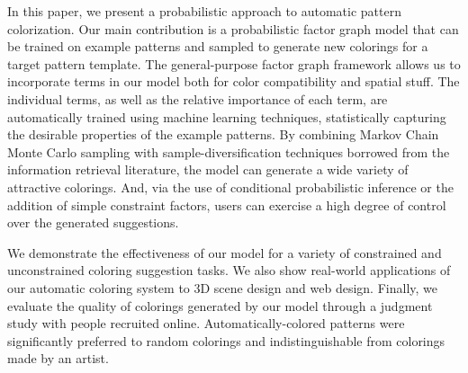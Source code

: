 In this paper, we present a probabilistic approach to automatic pattern colorization. Our main contribution is a probabilistic factor graph model that can be trained on example patterns and sampled to generate new colorings for a target pattern template. The general-purpose factor graph framework allows us to incorporate terms in our model both for color compatibility and spatial stuff. The individual terms, as well as the relative importance of each term, are automatically trained using machine learning techniques, statistically capturing the desirable properties of the example patterns. By combining Markov Chain Monte Carlo sampling with sample-diversification techniques borrowed from the information retrieval literature, the model can generate a wide variety of attractive colorings. And, via the use of conditional probabilistic inference or the addition of simple constraint factors, users can exercise a high degree of control over the generated suggestions.

We demonstrate the effectiveness of our model for a variety of constrained and unconstrained coloring suggestion tasks. We also show real-world applications of our automatic coloring system to 3D scene design and web design. Finally, we evaluate the quality of colorings generated by our model through a judgment study with people recruited online. Automatically-colored patterns were significantly preferred to random colorings and indistinguishable from colorings made by an artist.